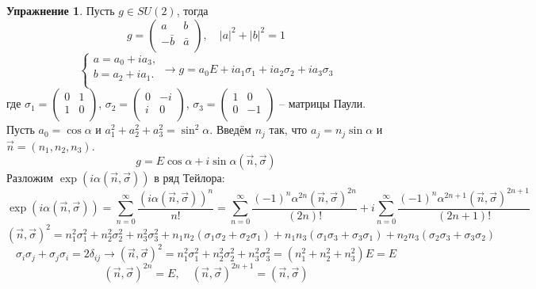 \documentclass[12pt]{article}
\theoremstyle{definition}
\newtheorem{upr}[zad]{Упражнение}
\begin{document}
\begin{upr}
Пусть $g\in SU(2)$, тогда
\begin{equation}
    g=\left(
    \begin{array}{cc}
    a & b\\
    -\bar{b} & \bar{a}\\ 
    \end{array}
    \right),\quad |a|^2+|b|^2=1
\end{equation}
\begin{equation}
    \left\{
    \begin{array}{l}
    a=a_0+ia_3,\\
    b=a_2+ia_1.\\
    \end{array}
    \right.\rightarrow g=a_0E+ia_1\sigma_1+ia_2\sigma_2+ia_3\sigma_3
\end{equation}
где $\sigma_1=\left(
    \begin{array}{cc}
    0 & 1\\
    1 & 0\\ 
    \end{array}
    \right)$, $\sigma_2=\left(
    \begin{array}{cc}
    0 & -i\\
    i & 0\\ 
    \end{array}
    \right)$, $\sigma_3=\left(
    \begin{array}{cc}
    1 & 0\\
    0 & -1\\ 
    \end{array}
    \right)$ -- матрицы Паули.\\
Пусть $a_0=\cos\alpha$ и $a_1^2+a_2^2+a_3^2=\sin^2\alpha$. Введём $n_j$ так, что $a_j=n_j\sin\alpha$ и $\vec{n}=(n_1,n_2,n_3)$.
\begin{equation}
    g=E\cos\alpha+i\sin\alpha(\vec{n},\vec{\sigma})
\end{equation}
Разложим $\exp(i\alpha(\vec{n},\vec{\sigma}))$ в ряд Тейлора:
\begin{equation}\label{eq3}
    \exp(i\alpha(\vec{n},\vec{\sigma}))=\sum\limits_{n=0}^\infty\frac{(i\alpha(\vec{n},\vec{\sigma}))^n}{n!}=\sum\limits_{n=0}^\infty\frac{(-1)^n\alpha^{2n}(\vec{n},\vec{\sigma})^{2n}}{(2n)!}+i\sum\limits_{n=0}^\infty\frac{(-1)^n\alpha^{2n+1}(\vec{n},\vec{\sigma})^{2n+1}}{(2n+1)!}
\end{equation}
\begin{equation}
    (\vec{n},\vec{\sigma})^2=n_1^2\sigma_1^2+n_2^2\sigma_2^2+n_3^2\sigma_3^2+n_1n_2(\sigma_1\sigma_2+\sigma_2\sigma_1)+n_1n_3(\sigma_1\sigma_3+\sigma_3\sigma_1)+n_2n_3(\sigma_2\sigma_3+\sigma_3\sigma_2)
\end{equation}
\begin{equation}
    \sigma_i\sigma_j+\sigma_j\sigma_i=2\delta_{ij}\rightarrow (\vec{n},\vec{\sigma})^2=n_1^2\sigma_1^2+n_2^2\sigma_2^2+n_3^2\sigma_3^2=(n_1^2+n_2^2+n_3^2)E=E
\end{equation}
\begin{equation}\label{eq4}
    (\vec{n},\vec{\sigma})^{2n}=E,\quad (\vec{n},\vec{\sigma})^{2n+1}=(\vec{n},\vec{\sigma})
\end{equation}
\end{upr}
\end{document}
